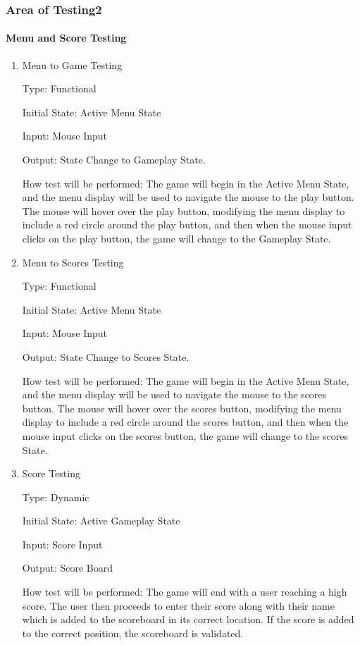 \documentclass[12pt, titlepage]{article}
\begin{document}
\subsubsection{Area of Testing2}
		
\paragraph{Menu and Score Testing}

\begin{enumerate}

\item{Menu to Game Testing\\}

Type: Functional
					
Initial State: Active Menu State
					
Input: Mouse Input
					
Output: State Change to Gameplay State.
					
How test will be performed: The game will begin in the Active Menu State, and the menu display will be used to navigate the mouse to the play button. The mouse will hover over the play button, modifying the menu display to include a red circle around the play button, and then when the mouse input clicks on the play button, the game will change to the Gameplay State. 
					
\item{Menu to Scores Testing\\}

Type: Functional
					
Initial State: Active Menu State
					
Input: Mouse Input
					
Output: State Change to Scores State.
					
How test will be performed: The game will begin in the Active Menu State, and the menu display will be used to navigate the mouse to the scores button. The mouse will hover over the scores button, modifying the menu display to include a red circle around the scores button, and then when the mouse input clicks on the scores button, the game will change to the scores State. 

\item{Score Testing\\}

Type: Dynamic
					
Initial State: Active Gameplay State
					
Input: Score Input
					
Output: Score Board
					
How test will be performed: The game will end with a user reaching a high score. The user then proceeds to enter their score along with their name which is added to the scoreboard in its correct location. If the score is added to the correct position, the scoreboard is validated.

\end{enumerate}
\end{document}
